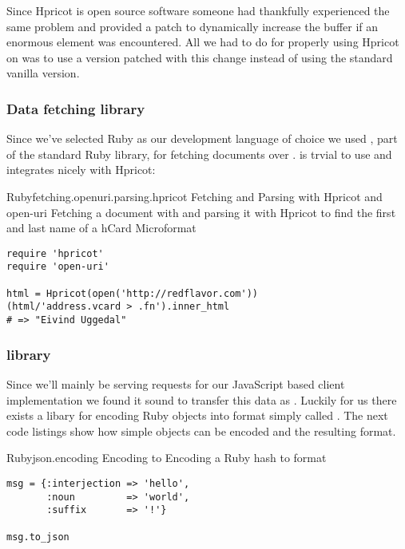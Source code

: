 Since Hpricot is open source software someone had thankfully experienced
the same problem and provided a patch to dynamically increase the
buffer if an enormous  element was encountered. All we had to do
for properly using Hpricot on \urort{} was to use a version patched with this
change instead of using the standard vanilla version.

\subsubsection{Data fetching library}

Since we've selected Ruby as our development language of choice we used
, part of the standard Ruby library, for fetching
documents over .
 is trvial to use and integrates nicely with Hpricot:

\begin{scode}{Ruby}{fetching.openuri.parsing.hpricot}{%
  Fetching and Parsing with Hpricot and open-uri}{%
  Fetching a  document with 
  and parsing it with Hpricot to find the first and
  last name of a hCard Microformat}
\begin{lstlisting}
require 'hpricot'
require 'open-uri'

html = Hpricot(open('http://redflavor.com'))
(html/'address.vcard > .fn').inner_html
# => "Eivind Uggedal"
\end{lstlisting}
\end{scode}

\subsubsection{ library}

Since we'll mainly be serving requests
for our JavaScript based client implementation we found it sound to transfer
this data as %
.
Luckily for us there exists a libary for encoding
Ruby objects into  format
simply called %
.
The next code listings show how simple objects can be encoded and the
resulting  format.

\begin{scode}{Ruby}{json.encoding}{%
  Encoding to }{%
  Encoding a Ruby hash to  format}
\begin{lstlisting}
msg = {:interjection => 'hello',
       :noun         => 'world',
       :suffix       => '!'}

msg.to_json
\end{lstlisting}
\end{scode}


